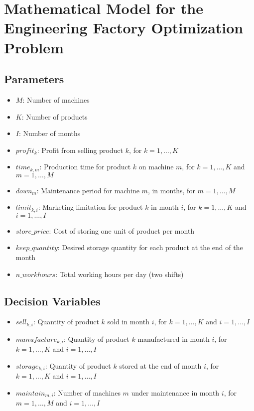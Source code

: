 \documentclass{article}
\begin{document}
\section*{Mathematical Model for the Engineering Factory Optimization Problem}

\subsection*{Parameters}
\begin{itemize}
    \item $M$: Number of machines
    \item $K$: Number of products
    \item $I$: Number of months
    \item $profit_k$: Profit from selling product $k$, for $k=1,\ldots,K$
    \item $time_{k,m}$: Production time for product $k$ on machine $m$, for $k=1,\ldots,K$ and $m=1,\ldots,M$
    \item $down_m$: Maintenance period for machine $m$, in months, for $m=1,\ldots,M$
    \item $limit_{k,i}$: Marketing limitation for product $k$ in month $i$, for $k=1,\ldots,K$ and $i=1,\ldots,I$
    \item $store\_price$: Cost of storing one unit of product per month
    \item $keep\_quantity$: Desired storage quantity for each product at the end of the month
    \item $n\_workhours$: Total working hours per day (two shifts)
\end{itemize}

\subsection*{Decision Variables}
\begin{itemize}
    \item $sell_{k,i}$: Quantity of product $k$ sold in month $i$, for $k=1,\ldots,K$ and $i=1,\ldots,I$
    \item $manufacture_{k,i}$: Quantity of product $k$ manufactured in month $i$, for $k=1,\ldots,K$ and $i=1,\ldots,I$
    \item $storage_{k,i}$: Quantity of product $k$ stored at the end of month $i$, for $k=1,\ldots,K$ and $i=1,\ldots,I$
    \item $maintain_{m,i}$: Number of machines $m$ under maintenance in month $i$, for $m=1,\ldots,M$ and $i=1,\ldots,I$
\end{itemize}
\end{document}
